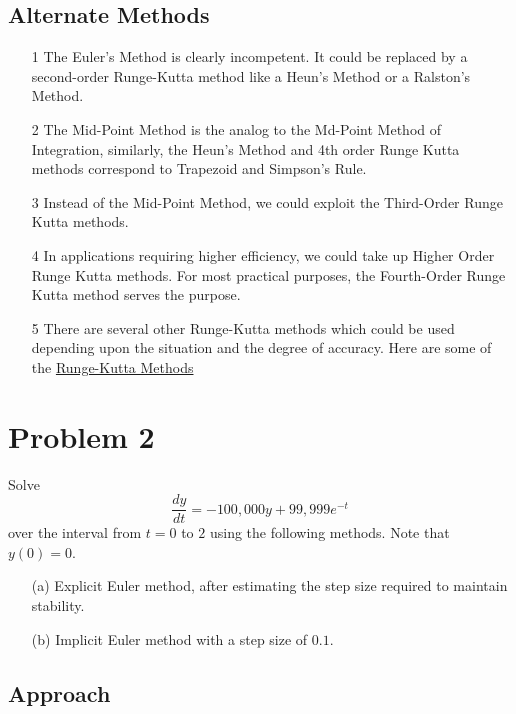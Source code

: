 \documentclass[titlepage, 11pt]{article}
\begin{document}
\subsection{Alternate Methods}
\begin{itemize}
    \item [1] The Euler's Method is clearly incompetent. It could be replaced by a second-order Runge-Kutta method like a Heun's Method or a Ralston's Method.
    \item [2] The Mid-Point Method is the analog to the Md-Point Method of Integration, similarly, the Heun's Method and 4th order Runge Kutta methods correspond to Trapezoid and Simpson's Rule. 
    \item [3] Instead of the Mid-Point Method, we could exploit the Third-Order Runge Kutta methods. 
    \item [4] In applications requiring higher efficiency, we could take up Higher Order Runge Kutta methods. For most practical purposes, the Fourth-Order Runge Kutta method serves the purpose.
    \item [5] There are several other Runge-Kutta methods which could be used depending upon the situation and the degree of accuracy. Here are some of the \href{https://en.wikipedia.org/wiki/List_of_Runge%E2%80%93Kutta_methods#Ralston's_method}{Runge-Kutta Methods}
\end{itemize}

\newpage
\section{Problem 2}
\noindent Solve 
\begin{equation*}
    \frac{dy}{dt} = -100,000y + 99,999e^{-t}
\end{equation*}
over the interval from $t = 0$ to $2$ using the following methods. Note that $y(0) = 0$.

\begin{itemize}
    \item [(a)] Explicit Euler method, after estimating the step size required to maintain stability. 
    
    \item [(b)] Implicit Euler method with a step size of $0.1$.

\end{itemize}

\subsection{Approach}
\end{document}
